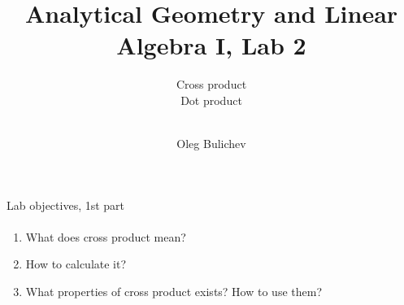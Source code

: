 \documentclass[aspectratio=169,notes]{beamer}
\title[AGLA1]{Analytical Geometry and Linear Algebra I, Lab 2} %
\subtitle{Cross product \\ Dot product  \\ \   
         } %
\author{Oleg Bulichev}
\newcommand{\fbckg}[1]{\usebackgroundtemplate{\texttt{[image: \#1]}}}%
\begin{document}
\setlength{\abovedisplayskip}{0pt}
\setlength{\belowdisplayskip}{0pt}
\setlength{\abovedisplayshortskip}{0pt}
\setlength{\belowdisplayshortskip}{0pt}

\fbckg{fibeamer/figs/title_page.png}

\fbckg{fibeamer/figs/common.png}

\begin{frame}[t]{Lab objectives, 1st part}
\framesubtitle{}
    \begin{enumerate}
        \item What does cross product mean?
        \item How to calculate it?
        \item What properties of cross product exists? How to use them?
    \end{enumerate}
\end{frame}
\end{document}
